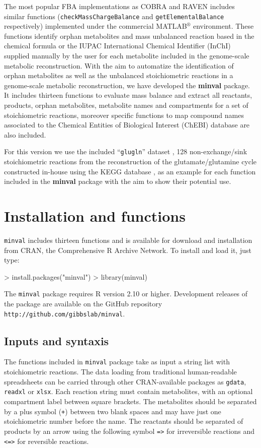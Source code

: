 The most popular FBA implementations as COBRA and RAVEN includes similar functions (\texttt{checkMassChargeBalance} and \texttt{getElementalBalance} respectively) implemented under the commercial MATLAB$^{\circledR}$ environment. These functions identify orphan metabolites and mass unbalanced reaction based in the chemical formula or the IUPAC International Chemical Identifier (InChI) supplied manually by the user for each metabolite included in the genome-scale metabolic reconstruction. With the aim to automatize the identification of orphan metabolites as well as the unbalanced stoichiometric reactions in a genome-scale metabolic reconstruction, we have developed the \textbf{minval} package. It includes thirteen functions to evaluate mass balance and extract all reactants, products, orphan metabolites, metabolite names and compartments for a set of stoichiometric reactions, moreover specific functions to map compound names associated to the Chemical Entities of Biological Interest (ChEBI) database are also included.

For this version we use the included ``\texttt{glugln}'' dataset \cite{NelsonE.2015}, 128 non-exchange/sink stoichiometric reactions from the reconstruction of the glutamate/glutamine cycle constructed in-house using the KEGG database , as an example for each function included in the \textbf{minval} package with the aim to show their potential use.
\section{Installation and functions}
\texttt{minval} includes thirteen functions and is available for download and installation from CRAN, the
Comprehensive R Archive Network. To install and load it, just type:
\begin{Schunk}
\begin{Sinput}
> install.packages("minval")
> library(minval)
\end{Sinput}
\end{Schunk}
The \texttt{minval} package requires R version 2.10 or higher. Development releases of the package are available on the GitHub repository \texttt{http://github.com/gibbslab/minval}.
\subsection{Inputs and syntaxis}
The functions included in \texttt{minval} package take as input a string list with stoichiometric reactions. The data loading from traditional human-readable spreadsheets can be carried through other CRAN-available packages as \texttt{gdata}, \texttt{readxl} or \texttt{xlsx}. Each reaction string must contain metabolites, with an optional compartment label between square brackets. The metabolites should be separated by a plus symbol (\texttt{+}) between two blank spaces and may have just one stoichiometric number before the name. The reactants should be separated of products by an arrow using the following symbol \texttt{=>} for irreversible reactions and \texttt{<=>} for reversible reactions.

